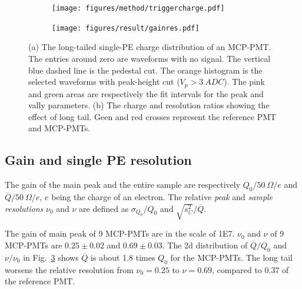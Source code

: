 \begin{figure}[!htbp]
    \centering
    \begin{subfigure}[b]{\SF\textwidth}
        \texttt{[image: figures/method/triggercharge.pdf]}
        \caption{}%
        \label{fig:triggercharge}
    \end{subfigure}
    \begin{subfigure}[b]{\SF\textwidth}
        \texttt{[image: figures/result/gainres.pdf]}
        \caption{}
        \label{fig:totalchargeCompare}
    \end{subfigure}
    \caption{(a) The long-tailed single-PE charge distribution of an MCP-PMT. The entries around zero are waveforms with no signal. The vertical blue dashed line is the pedestal cut. The orange histogram is the selected waveforms with peak-height cut ($V_p>\SI{3}{ADC}$). The pink and green areas are respectively the fit intervals for the peak and vally parameters.%
    (b) The charge and resolution ratios showing the effect of long tail. Geen and red crosses represent the reference PMT and MCP-PMTs.
    }
\end{figure}

\subsection{Gain and single PE resolution}
\label{sec:noisegain}

The gain of the main peak and the entire sample are respectively ${Q_0}/{\SI{50}{\Omega}}/e$ and ${\overline{Q}}/{\SI{50}{\Omega}}/e$, $e$ being the charge of an electron. The relative \emph{peak} and \emph{sample resolutions} $\nu_0$ and $\nu$ are defined as ${\sigma_{Q_0}}/{Q_0}$ and ${\sqrt{s^2_{C}}}/{\overline{Q}}$.

The gain of main peak of 9 MCP-PMTs are in the scale of 1E7. $\nu_0$ and $\nu$ of 9 MCP-PMTs are $0.25\pm0.02$ and $0.69\pm0.03$. The 2d distribution of $\overline{Q}/{Q_0}$ and $\nu/{\nu_0}$ in Fig.~\ref{fig:totalchargeCompare} shows $\overline{Q}$ is about 1.8 times $Q_0$ for the MCP-PMTs. The long tail worsens the relative resolution from $\nu_0=0.25$ to $\nu=0.69$, compared to 0.37 of the reference PMT.

